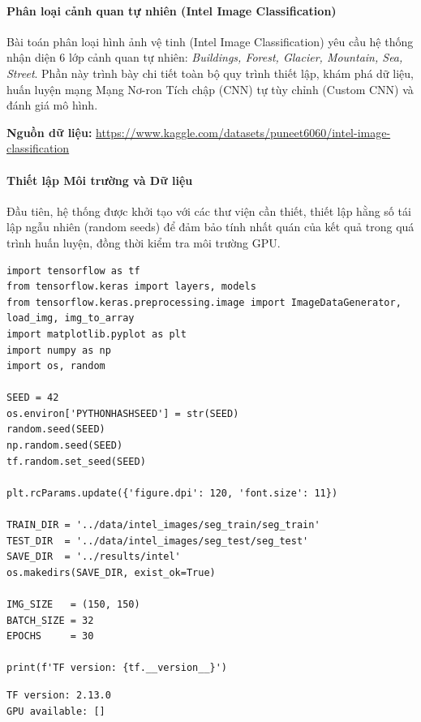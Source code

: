 \paragraph{Phân loại cảnh quan tự nhiên (Intel Image Classification)} \hfill\mbox{}

Bài toán phân loại hình ảnh vệ tinh (Intel Image Classification) yêu cầu hệ thống nhận diện 6 lớp cảnh quan tự nhiên: \textit{Buildings, Forest, Glacier, Mountain, Sea, Street}. Phần này trình bày chi tiết toàn bộ quy trình thiết lập, khám phá dữ liệu, huấn luyện mạng Mạng Nơ-ron Tích chập (CNN) tự tùy chỉnh (Custom CNN) và đánh giá mô hình.

\begin{center}
    \textbf{Nguồn dữ liệu:} \url{https://www.kaggle.com/datasets/puneet6060/intel-image-classification}
\end{center}

\paragraph{Thiết lập Môi trường và Dữ liệu} \hfill\mbox{}

Đầu tiên, hệ thống được khởi tạo với các thư viện cần thiết, thiết lập hằng số tái lập ngẫu nhiên (random seeds) để đảm bảo tính nhất quán của kết quả trong quá trình huấn luyện, đồng thời kiểm tra môi trường GPU.

\begin{lstlisting}[style=pythoncode, caption={Khởi tạo môi trường TensorFlow và thiết lập đường dẫn}]
import tensorflow as tf
from tensorflow.keras import layers, models
from tensorflow.keras.preprocessing.image import ImageDataGenerator, load_img, img_to_array
import matplotlib.pyplot as plt
import numpy as np
import os, random

SEED = 42
os.environ['PYTHONHASHSEED'] = str(SEED)
random.seed(SEED)
np.random.seed(SEED)
tf.random.set_seed(SEED)

plt.rcParams.update({'figure.dpi': 120, 'font.size': 11})

TRAIN_DIR = '../data/intel_images/seg_train/seg_train'
TEST_DIR  = '../data/intel_images/seg_test/seg_test'
SAVE_DIR  = '../results/intel'
os.makedirs(SAVE_DIR, exist_ok=True)

IMG_SIZE   = (150, 150)
BATCH_SIZE = 32
EPOCHS     = 30

print(f'TF version: {tf.__version__}')
\end{lstlisting}

\begin{lstlisting}[style=consoleoutput, caption={Output: Thông tin hệ thống TensorFlow}]
TF version: 2.13.0
GPU available: []
\end{lstlisting}


